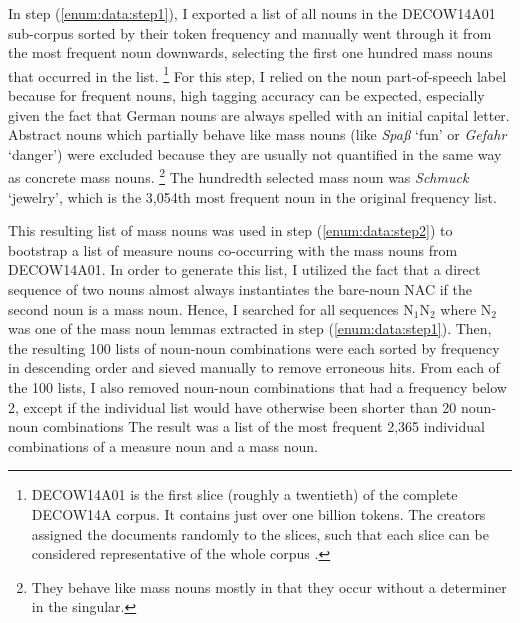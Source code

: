 \documentclass[USenglish]{article}
\newcommand{\Sub}[1]{\ensuremath{\mathrm{_{#1}}}}
\begin{document}
\vspace{-1\baselineskip}

In step (\ref{enum:data:step1}), I exported a list of all nouns in the DECOW14A01 sub-corpus sorted by their token frequency and manually went through it from the most frequent noun downwards, selecting the first one hundred mass nouns that occurred in the list.%
\footnote{DECOW14A01 is the first slice (roughly a twentieth) of the complete DECOW14A corpus.
It contains just over one billion tokens.
The creators assigned the documents randomly to the slices, such that each slice can be considered representative of the whole corpus \cite{Schaefer2015b}.}
For this step, I relied on the noun part-of-speech label because for frequent nouns, high tagging accuracy can be expected, especially given the fact that German nouns are always spelled with an initial capital letter.
Abstract nouns which partially behave like mass nouns (like \textit{Spaß} `fun’ or \textit{Gefahr} `danger’) were excluded because they are usually not quantified in the same way as concrete mass nouns.%
\footnote{They behave like mass nouns mostly in that they occur without a determiner in the singular.}
The hundredth selected mass noun was \textit{Schmuck} `jewelry’, which is the 3,054th most frequent noun in the original frequency list.

This resulting list of mass nouns was used in step (\ref{enum:data:step2}) to bootstrap a list of measure nouns co-occurring with the mass nouns from DECOW14A01.
In order to generate this list, I utilized the fact that a direct sequence of two nouns almost always instantiates the bare-noun NAC if the second noun is a mass noun.
Hence, I searched for all sequences N\Sub{1}N\Sub{2} where N\Sub{2} was one of the mass noun lemmas extracted in step (\ref{enum:data:step1}).
Then, the resulting 100 lists of noun-noun combinations were each sorted by frequency in descending order and sieved manually to remove erroneous hits.
From each of the 100 lists, I also removed noun-noun combinations that had a frequency below 2, except if the individual list would have otherwise been shorter than 20 noun-noun combinations
The result was a list of the most frequent 2,365 individual combinations of a measure noun and a mass noun.
\end{document}
